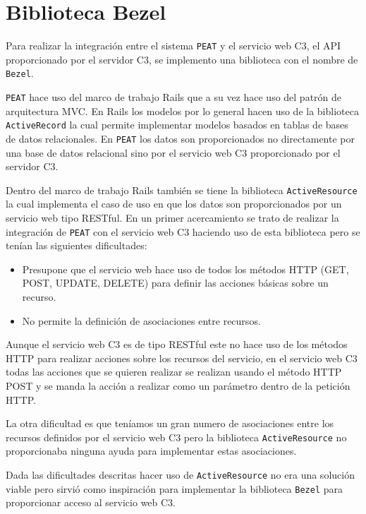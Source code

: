 \section{Biblioteca Bezel}

Para realizar la integración entre el sistema \texttt{PEAT} y el servicio web C3,
el API proporcionado por el servidor C3, se implemento una biblioteca con el nombre
de \texttt{Bezel}.

\texttt{PEAT} hace uso del marco de trabajo Rails que a su vez hace
uso del patrón de arquitectura MVC. En Rails los modelos por lo general hacen uso
de la biblioteca \texttt{ActiveRecord} la cual permite implementar modelos basados
en tablas de bases de datos relacionales. En \texttt{PEAT} los datos
son proporcionados no directamente por una base de datos relacional sino por
el servicio web C3 proporcionado por el servidor C3.

Dentro del marco de trabajo Rails también se tiene la biblioteca
\texttt{ActiveResource} la cual implementa el caso de uso en que los datos son
proporcionados por un servicio web tipo RESTful. En un primer acercamiento se trato
de realizar la integración de \texttt{PEAT} con el servicio web C3 haciendo uso de
esta biblioteca pero se tenían las siguientes dificultades:

\begin{itemize}
\item Presupone que el servicio web hace uso de todos los métodos HTTP (GET, POST,
  UPDATE, DELETE) para definir las acciones básicas sobre un recurso.
\item No permite la definición de asociaciones entre recursos.
\end{itemize}

Aunque el servicio web C3 es de tipo RESTful este no hace uso de los métodos
HTTP para realizar acciones sobre los recursos del servicio, en el servicio web
C3 todas las acciones que se quieren realizar se realizan usando el método HTTP
POST y se manda la acción a realizar como un parámetro dentro de la petición HTTP.

La otra dificultad es que teníamos un gran numero de asociaciones entre los
recursos definidos por el servicio web C3 pero la biblioteca \texttt{ActiveResource}
no proporcionaba ninguna ayuda para implementar estas asociaciones.

Dada las dificultades descritas hacer uso de \texttt{ActiveResource} no era una
solución viable pero sirvió como inspiración para implementar la biblioteca
\texttt{Bezel} para proporcionar acceso al servicio web C3.

